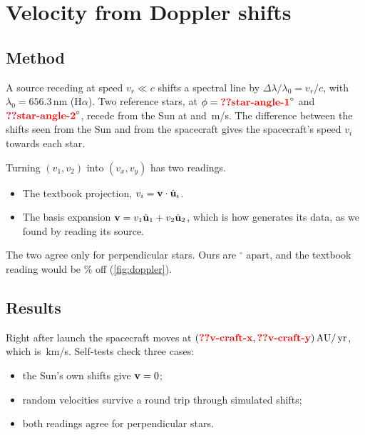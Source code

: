 \documentclass[aps,prd,twocolumn,nofootinbib,floatfix,superscriptaddress]{revtex4-2}
\begin{document}

\section{Velocity from Doppler shifts}\label{sec:doppler}
\subsection{Method}
A source receding at speed $v_r\ll c$ shifts a spectral line by $\Delta\lambda/\lambda_0=v_r/c$, with $\lambda_0=656.3$\,nm (H$\alpha$).
Two reference stars, at $\phi=\val{star-angle-1}^\circ$ and $\val{star-angle-2}^\circ$, recede from the Sun at  and \,m/s.
The difference between the shifts seen from the Sun and from the spacecraft gives the spacecraft's speed $v_i$ towards each star.

Turning $(v_1,v_2)$ into $(v_x,v_y)$ has two readings.
\begin{itemize}
\item The textbook projection, $v_i=\mathbf{v}\cdot\hat{\mathbf{u}}_i$.
\item The basis expansion $\mathbf{v}=v_1\hat{\mathbf{u}}_1+v_2\hat{\mathbf{u}}_2$, which is how  generates its data, as we found by reading its source.
\end{itemize}
The two agree only for perpendicular stars.
Ours are $^\circ$ apart, and the textbook reading would be \% off (\cref{fig:doppler}).

\subsection{Results}
Right after launch the spacecraft moves at $(\val{v-craft-x},\val{v-craft-y})\AU/\yr$, which is \,km/s.
Self-tests check three cases:
\begin{itemize}
\item the Sun's own shifts give $\mathbf{v}=0$;
\item random velocities survive a round trip through simulated shifts;
\item both readings agree for perpendicular stars.
\end{itemize}
\end{document}
